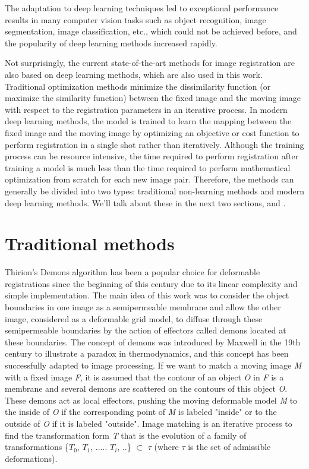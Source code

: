 \documentclass{book}
\begin{document}
	The adaptation to deep learning techniques led to exceptional performance results in many computer vision tasks such as object recognition, image segmentation, image classification, etc., which could not be achieved before, and the popularity of deep learning methods increased rapidly.
	
	Not surprisingly, the current state-of-the-art methods for image registration are also based on deep learning methods, which are also used in this work. Traditional optimization methods minimize the dissimilarity function (or maximize the similarity function) between the fixed image and the moving image with respect to the registration parameters in an iterative process. In modern deep learning methods, the model is trained to learn the mapping between the fixed image and the moving image by optimizing an objective or cost function to perform registration in a single shot rather than iteratively. Although the training process can be resource intensive, the time required to perform registration after training a model is much less than the time required to perform mathematical optimization from scratch for each new image pair. Therefore, the methods can generally be divided into two types: traditional non-learning methods and modern deep learning methods. We'll talk about these in the next two sections,  and .
	
	\section{Traditional methods}
	\label{section:traditional}
	
	Thirion's Demons algorithm \cite{THIRION1998243} has been a popular choice for deformable registrations since the beginning of this century due to its linear complexity and simple implementation. The main idea of this work was to consider the object boundaries in one image as a semipermeable membrane and allow the other image, considered as a deformable grid model, to diffuse through these semipermeable boundaries by the action of effectors called demons located at these boundaries. The concept of demons was introduced by Maxwell in the 19th century to illustrate a paradox in thermodynamics, and this concept has been successfully adapted to image processing. If we want to match a moving image \emph{M} with a fixed image \emph{F}, it is assumed that the contour of an object \emph{O} in \emph{F} is a membrane and several demons are scattered on the contours of this object \emph{O}. These demons act as local effectors, pushing the moving deformable model \emph{M} to the inside of \emph{O} if the corresponding point of \emph{M} is labeled "inside" or to the outside of \emph{O} if it is labeled "outside".
	Image matching is an iterative process to find the transformation form \emph{T} that is the  evolution of a family of transformations \{$T_0$, $T_1$, ..... $T_i$, ..\} $\subset$ $\tau$ (where $\tau$ is the set of admissible deformations).
	
\end{document}
